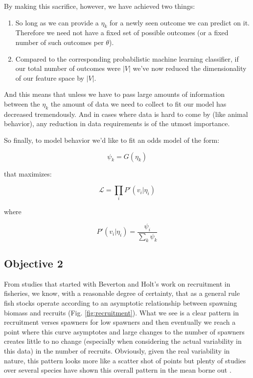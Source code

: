 \documentclass[11pt]{article}
\begin{document}
By making this sacrifice, however, we have achieved two things:

\begin{enumerate}
\item So long as we can provide a $\eta_k$ for a newly seen outcome we can predict on it. Therefore we need not have a fixed set of possible outcomes (or a fixed number of such outcomes per $\theta$).
\item Compared to the corresponding probabilistic machine learning classifier, if our total number of outcomes were $|V|$ we've now reduced the dimensionality of our feature space by $|V|$. 
\end{enumerate}

And this means that unless we have to pass large amounts of information between the $\eta_k$ the amount of data we need to collect to fit our model has decreased tremendously. And in cases where data is hard to come by (like animal behavior), any reduction in data requirements is of the utmost importance. 

So finally, to model behavior we'd like to fit an odds model of the form:

$$\psi_k = G(\eta_k)$$

that maximizes:

$$\mathcal{L}=\prod_i P'(v_i | \eta_i)$$

where 

$$P'(v_i|\eta_i) = \frac{\psi_i}{\sum_k \psi_k}$$\newline









\subsection{Objective 2}

From studies that started with Beverton and Holt's work on recruitment in fisheries, we know, with a reasonable degree of certainty, that as a general rule fish stocks operate according to an asymptotic relationship between spawning biomass and recruits \citep{waltersmartell} (Fig. \ref{fig:recruitment}). What we see is a clear pattern in recruitment verses spawners for low spawners and then eventually we reach a point where this curve asymptotes and large changes to the number of spawners creates little to no change (especially when considering the actual variability in this data) in the number of recruits. Obviously, given the real variability in nature, this pattern looks more like a scatter shot of points but plenty of studies over several species have shown this overall pattern in the mean borne out \citep{waltersmartell}. \newline
\end{document}
